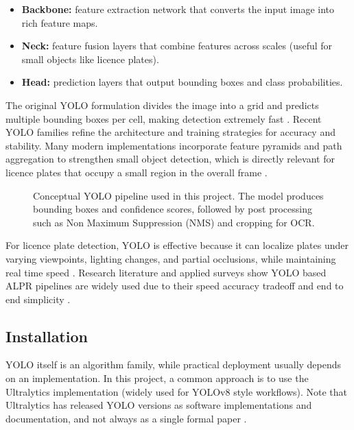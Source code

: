 \begin{itemize}
	\item \textbf{Backbone:} feature extraction network that converts the input image into rich feature maps.
	\item \textbf{Neck:} feature fusion layers that combine features across scales (useful for small objects like licence plates).
	\item \textbf{Head:} prediction layers that output bounding boxes and class probabilities.
\end{itemize}

The original YOLO formulation divides the image into a grid and predicts multiple bounding boxes per cell, making detection extremely fast \cite{redmon2016yolo}. Recent YOLO families refine the architecture and training strategies for accuracy and stability. Many modern implementations incorporate feature pyramids and path aggregation to strengthen small object detection, which is directly relevant for licence plates that occupy a small region in the overall frame \cite{yaseen2024whatisyolov8}.

\begin{figure}[htbp]
	\centering
	
	\captionsetup{font=small}
	\caption{Conceptual YOLO pipeline used in this project. The model produces bounding boxes and confidence scores, followed by post processing such as Non Maximum Suppression (NMS) and cropping for OCR.}
	\label{fig:yolo_pipeline}
\end{figure}

\noindent
For licence plate detection, YOLO is effective because it can localize plates under varying viewpoints, lighting changes, and partial occlusions, while maintaining real time speed \cite{yolov4lp_rg,anpr_yolov8_rg}. Research literature and applied surveys show YOLO based ALPR pipelines are widely used due to their speed accuracy tradeoff and end to end simplicity \cite{yolo_alpr_end2end_rg}.

\subsection{Installation}

YOLO itself is an algorithm family, while practical deployment usually depends on an implementation. In this project, a common approach is to use the Ultralytics implementation (widely used for YOLOv8 style workflows). Note that Ultralytics has released YOLO versions as software implementations and documentation, and not always as a single formal paper \cite{ultralytics_issue_paper}.\newline

